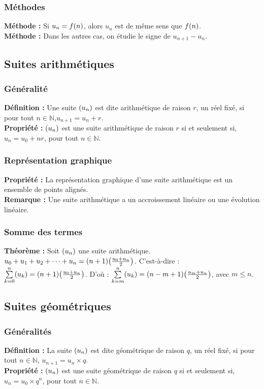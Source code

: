 \documentclass[a4paper,titlepage]{article}
\let\oldleft\left
\renewcommand{\left}{\mathopen{}\mathclose\bgroup\oldleft}
\let\oldright\right
\renewcommand{\right}{\aftergroup\egroup\oldright}
\begin{document}
        \subsubsection{Méthodes}
            \textbf{Méthode :} Si $u_{n}=f\left(n\right)$, alors $u_{n}$ est de même sens que $f\left(n\right)$.
            \\
            \textbf{Méthode :} Dans les autres cas, on étudie le signe de $u_{n+1}-u_{n}$.
    \subsection{Suites arithmétiques}
        \subsubsection{Généralité}
            \textbf{Définition :} Une suite $\left(u_{n}\right)$ est dite arithmétique de raison $r$, un réel fixé, si pour tout $n\in\mathbb{N}$,\linebreak$u_{n+1}=u_{n}+r$.
            \\
            \textbf{Propriété :} $\left(u_{n}\right)$ est une suite arithmétique de raison $r$ si et seulement si, $u_{n}=u_{0}+nr$, pour tout $n\in\mathbb{N}$.
        \subsubsection{Représentation graphique}
            \textbf{Propriété :} La représentation graphique d’une suite arithmétique est un ensemble de points alignés.
            \\
            \textbf{Remarque :} Une suite arithmétique a un accroissement linéaire ou une évolution linéaire.
        \subsubsection{Somme des termes}
            \textbf{Théorème :} Soit $\left(u_{n}\right)$ une suite arithmétique. $u_{0}+u_{1}+u_{2}+\cdots+u_{n}=\left(n+1\right)\left(\frac{u_{0}+u_{n}}{2}\right)$. C’est-à-dire : $\sum\limits_{k=0}^{n}\left(u_{k}\right)=\left(n+1\right)\left(\frac{u_{0}+u_{n}}{2}\right)$. D’où : $\sum\limits_{k=m}^{n}\left(u_{k}\right)=\left(n-m+1\right)\left(\frac{u_{m}+u_{n}}{2}\right)$, avec $m\leqslant n$.
    \subsection{Suites géométriques}
        \subsubsection{Généralités}
            \textbf{Définition :} La suite $\left(u_{n}\right)$ est dite géométrique de raison $q$, un réel fixé, si pour tout $n\in\mathbb{N}$, $u_{n+1}=u_{n}\times q$.
            \\
            \textbf{Propriété :} $\left(u_{n}\right)$ est une suite géométrique de raison $q$ si et seulement si, $u_{n}=u_{0}\times q^{n}$, pour tout $n\in\mathbb{N}$.
\end{document}
